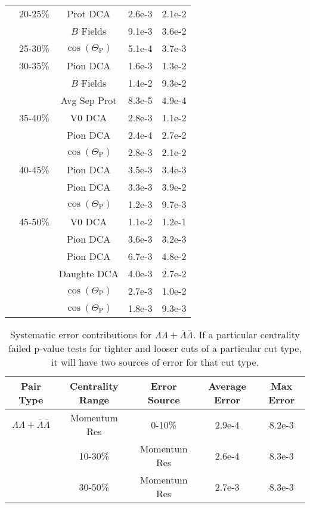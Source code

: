 \begin{table}
\begin{center}
\begin{tabular}{| c | c | c | c | c |}
   & 20-25\% & Prot DCA & 2.6e-3 & 2.1e-2 \\
   &         & $B$ Fields & 9.1e-3 & 3.6e-2 \\
   & 25-30\% & $\cos(\Theta_{\mathrm{P}})$ & 5.1e-4 & 3.7e-3 \\
   & 30-35\% & Pion DCA & 1.6e-3 & 1.3e-2 \\
   &         & $B$ Fields & 1.4e-2 & 9.3e-2 \\
   &         & Avg Sep Prot & 8.3e-5 & 4.9e-4 \\
   & 35-40\% & V0 DCA & 2.8e-3 & 1.1e-2 \\
   &         & Pion DCA & 2.4e-4 & 2.7e-2 \\
   &         & $\cos(\Theta_{\mathrm{P}})$ & 2.8e-3 & 2.1e-2 \\
   & 40-45\% & Pion DCA & 3.5e-3 & 3.4e-3 \\
   &         & Pion DCA & 3.3e-3 & 3.9e-2 \\
   &         & $\cos(\Theta_{\mathrm{P}})$ & 1.2e-3 & 9.7e-3 \\
   & 45-50\% & V0 DCA & 1.1e-2 & 1.2e-1 \\
   &         & Pion DCA & 3.6e-3 & 3.2e-3 \\
   &         & Pion DCA & 6.7e-3 & 4.8e-2 \\
   &         & Daughte DCA & 4.0e-3 & 2.7e-2 \\
   &         & $\cos(\Theta_{\mathrm{P}})$ & 2.7e-3 & 1.0e-2 \\
   &         & $\cos(\Theta_{\mathrm{P}})$ & 1.8e-3 & 9.3e-3 \\
   \hline
\end{tabular}
\end{center}
\end{table}
\begin{table}
\caption[Systematic error contributions for $\Lambda\Lambda + \bar{\Lambda}\bar{\Lambda}$] {Systematic error contributions for $\Lambda\Lambda + \bar{\Lambda}\bar{\Lambda}$.  
If a particular centrality failed p-value tests for tighter and looser cuts of a particular cut type, it will have two sources of error for that cut type.} \label{tab:SysErrorSourcesLLAA} 
\begin{center}
\begin{tabular}{| c | c | c | c | c |}
  \hline                       
  Pair Type & Centrality Range & Error Source & Average Error & Max Error \\
  \hline
  $\Lambda\Lambda + \bar{\Lambda}\bar{\Lambda}$ & Momentum Res & 0-10\% & 2.9e-4 & 8.2e-3 \\
   & 10-30\% & Momentum Res & 2.6e-4 & 8.3e-3 \\
   & 30-50\% & Momentum Res & 2.7e-3 & 8.3e-3 \\
  \hline
\end{tabular}
\end{center}
\end{table}
